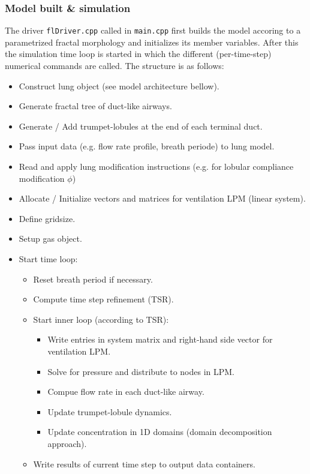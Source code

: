\subsubsection{Model built \& simulation}
The driver \texttt{flDriver.cpp} called in \texttt{main.cpp} first builds the model accoring to a parametrized fractal morphology and initializes its member variables.
After this the simulation time loop is started in which the different (per-time-step) numerical commands are called.
The structure is as follows:
\begin{itemize}
  \item Construct lung object (see model architecture bellow).
  \item Generate fractal tree of duct-like airways.
  \item Generate / Add trumpet-lobules at the end of each terminal duct.
  \item Pass input data (e.g. flow rate profile, breath periode) to lung model.
  \item Read and apply lung modification instructions (e.g. for lobular compliance modification $\phi$)
  \item Allocate / Initialize vectors and matrices for ventilation LPM (linear system).
  \item Define gridsize.
  \item Setup gas object.
  \item Start time loop:
  \begin{itemize}
    \item Reset breath period if necessary.
    \item Compute time step refinement (TSR).
    \item Start inner loop (according to TSR):
    \begin{itemize}
      \item Write entries in system matrix and right-hand side vector for ventilation LPM.
      \item Solve for pressure and distribute to nodes in LPM.
      \item Compue flow rate in each duct-like airway.
      \item Update trumpet-lobule dynamics.
      \item Update concentration in 1D domains (domain decomposition approach).
    \end{itemize}
    \item Write results of current time step to output data containers.
  \end{itemize}
\end{itemize}


